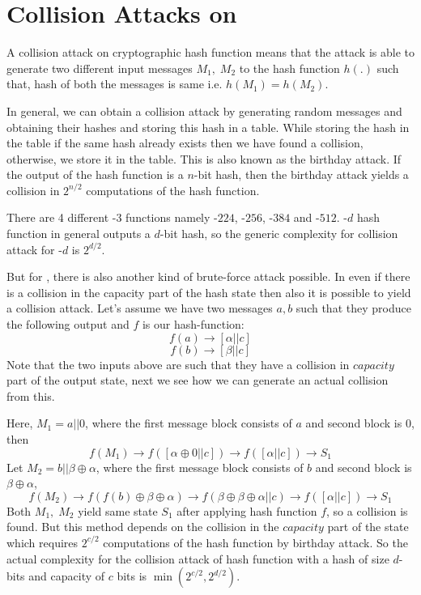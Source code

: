 \section{Collision Attacks on \KECCAK{}}

A collision attack on cryptographic hash function means that the attack is able to generate two different input messages $M_1,\; M_2$ to the hash function $h(.)$ such that, hash of both the messages is same i.e. $h(M_1) = h(M_2)$.

In general, we can obtain a collision attack by generating random messages and obtaining their hashes and storing this hash in a table. While storing the hash in the table if the same hash already exists then we have found a collision, otherwise, we store it in the table. This is also known as the birthday attack. If the output of the hash function is a $n$-bit hash, then the birthday attack yields a collision in $2^{n/2}$ computations of the hash function.

There are 4 different \SHA-$3$ functions namely -$224$, -$256$, -$384$ and -$512$. -$d$ hash function in general outputs a $d$-bit hash, so the generic complexity for collision attack for -$d$ is $2^{d/2}$.

But for \KECCAK{}, there is also another kind of brute-force attack possible. In \KECCAK{} even if there is a collision in the capacity part of the hash state then also it is possible to yield a collision attack. Let's assume we have two messages $a, b$ such that they produce the following output and $f$ is our hash-function:
\[
    f(a) \rightarrow \left[ \alpha || c \right]
\]
\[
    f(b) \rightarrow \left[ \beta || c \right]
\]
Note that the two inputs above are such that they have a collision in $capacity$ part of the output state, next we see how we can generate an actual collision from this.

Here, $M_1 = a || 0$, where the first message block consists of $a$ and second block is $0$, then
\[
    f(M_1) \rightarrow f\left( \left[ \alpha \oplus 0 || c \right] \right) \rightarrow f\left( \left[ \alpha || c \right] \right) \rightarrow S_1
\]
Let $M_2 = b || \beta \oplus \alpha$, where the first message block consists of $b$ and second block is $\beta \oplus \alpha$, 
\[
    f(M_2) \rightarrow f\left( f(b) \oplus \beta \oplus \alpha \right) \rightarrow f\left( \beta \oplus \beta \oplus \alpha || c \right) \rightarrow f\left( \left[\alpha || c\right] \right) \rightarrow S_1
\]
Both $M_1,\; M_2$ yield same state $S_1$ after applying hash function $f$, so a collision is found. But this method depends on the collision in the $capacity$ part of the state which requires $2^{c/2}$ computations of the hash function by birthday attack. So the actual complexity for the collision attack of \KECCAK{} hash function with a hash of size $d$-bits and capacity of $c$ bits is $\min\left( 2^{c/2}, 2^{d/2}\right)$.

